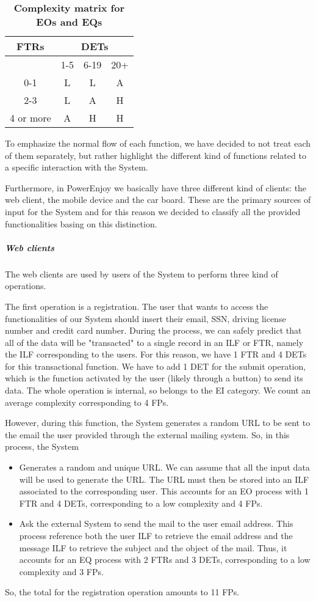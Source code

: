 \begin{longtable}{| c | c | c | c |}
	\caption{\textbf{Complexity matrix for EOs and EQs}}
	\label{tab:eo_eq_complexity_matrix}
	\\ \hline
	
	\textbf{FTRs}  & \multicolumn{3}{c|}{\textbf{DETs}} \\ \hline
   		 & 1-5  & 6-19  & 20+ \\ \hline 
	0-1  & L  & L  & A \\ \hline 
	2-3  & L  & A  & H \\ \hline 
	4 or more  & A  & H  & H \\ \hline 
\end{longtable}

To emphasize the normal flow of each function, we have decided to not treat each of them separately, but rather highlight the different kind of functions related to a specific interaction with the System.

Furthermore, in PowerEnjoy we basically have three different kind of clients: the web client, the mobile device and the car board. These are the primary sources of input for the System and for this reason we decided to classify all the  provided functionalities basing on this distinction.

\subparagraph{Web clients}
The web clients are used by users of the System to perform three kind of operations.

The first operation is a registration. The user that wants to access the functionalities of our System should insert their email, SSN, driving license number and credit card number. During the process, we can safely predict that all of the data will be "transacted" to a single record in an ILF or FTR, namely the ILF corresponding to the users. For this reason, we have 1 FTR and 4 DETs for this transactional function. We have to add 1 DET for the submit operation, which is the function activated by the user (likely through a button) to send its data. The whole operation is internal, so belongs to the EI category. We count an average complexity corresponding to 4 FPs.

However, during this function, the System generates a random URL to be sent to the email the user provided through the external mailing system. So, in this process, the System
\begin{itemize}
	\item Generates a random and unique URL. We can assume that all the input data will be used to generate the URL. The URL must then be stored into an ILF associated to the corresponding user. This accounts for an EO process with 1 FTR and 4 DETs, corresponding to a low complexity and 4 FPs.
	\item Ask the external System to send the mail to the user email address. This process reference both the user ILF to retrieve the email address and the message ILF to retrieve the subject and the object of the mail. Thus, it accounts for an EQ process with 2 FTRs and 3 DETs, corresponding to a low complexity and 3 FPs.
\end{itemize}
So, the total for the registration operation amounts to 11 FPs.
\smallskip

